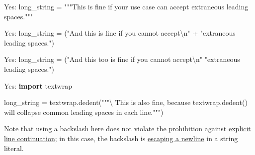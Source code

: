 \documentclass[
]{article}
\newenvironment{Shaded}{}{}
\newcommand{\CharTok}[1]{\textcolor[rgb]{0.25,0.44,0.63}{#1}}
\newcommand{\ImportTok}[1]{\textcolor[rgb]{0.00,0.50,0.00}{\textbf{#1}}}
\newcommand{\NormalTok}[1]{#1}
\newcommand{\OperatorTok}[1]{\textcolor[rgb]{0.40,0.40,0.40}{#1}}
\newcommand{\StringTok}[1]{\textcolor[rgb]{0.25,0.44,0.63}{#1}}
\begin{document}
\begin{samepage}
\begin{Shaded}
\begin{Highlighting}[]
\NormalTok{  Yes:}
\NormalTok{  long\_string }\OperatorTok{=} \StringTok{"""This is fine if your use case can accept}
\StringTok{      extraneous leading spaces."""}
\end{Highlighting}
\end{Shaded}
\end{samepage}

\begin{samepage}
\begin{Shaded}
\begin{Highlighting}[]
\NormalTok{  Yes:}
\NormalTok{  long\_string }\OperatorTok{=}\NormalTok{ (}\StringTok{"And this is fine if you cannot accept}\CharTok{\textbackslash{}n}\StringTok{"} \OperatorTok{+}
                 \StringTok{"extraneous leading spaces."}\NormalTok{)}
\end{Highlighting}
\end{Shaded}
\end{samepage}

\begin{samepage}
\begin{Shaded}
\begin{Highlighting}[]
\NormalTok{  Yes:}
\NormalTok{  long\_string }\OperatorTok{=}\NormalTok{ (}\StringTok{"And this too is fine if you cannot accept}\CharTok{\textbackslash{}n}\StringTok{"}
                 \StringTok{"extraneous leading spaces."}\NormalTok{)}
\end{Highlighting}
\end{Shaded}
\end{samepage}

\begin{samepage}
\begin{Shaded}
\begin{Highlighting}[]
\NormalTok{  Yes:}
  \ImportTok{import}\NormalTok{ textwrap}

\NormalTok{  long\_string }\OperatorTok{=}\NormalTok{ textwrap.dedent(}\StringTok{"""}\CharTok{\textbackslash{}}
\StringTok{      This is also fine, because textwrap.dedent()}
\StringTok{      will collapse common leading spaces in each line."""}\NormalTok{)}
\end{Highlighting}
\end{Shaded}
\end{samepage}

Note that using a backslash here does not violate the prohibition
against \hyperref[line-length]{explicit line continuation}; in this
case, the backslash is
\href{https://docs.python.org/3/reference/lexical_analysis.html\#string-and-bytes-literals}{escaping
a newline} in a string literal.
\end{document}
